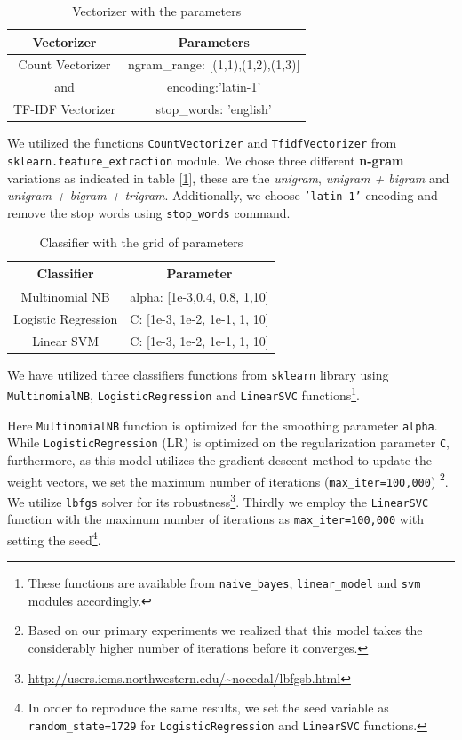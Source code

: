 \documentclass[11pt]{article}
\begin{document}
 \begin{table}[h!]
\scriptsize
     \centering
     \begin{tabular}{c|c}
     \hline 
         \textbf{Vectorizer} & \textbf{Parameters}  \\ \hline 
          Count Vectorizer & ngram\_range: [(1,1),(1,2),(1,3)]\\
          and & encoding:'latin-1'\\
          TF-IDF Vectorizer & stop\_words: 'english' \\
          \hline 
     \end{tabular}
     \caption{Vectorizer with the parameters}
     \label{tab:vectorizer_paras}
 \end{table}
We utilized the functions \texttt{CountVectorizer} and \texttt{TfidfVectorizer} from \texttt{sklearn.feature\_extraction} module. We chose three different \textbf{n-gram} variations as indicated in table [\ref{tab:vectorizer_paras}], these are the \textit{unigram}, \textit{unigram + bigram} and \textit{unigram + bigram + trigram}.
Additionally, we choose \texttt{'latin-1'} encoding and remove the stop words using \texttt{stop\_words} command.
\begin{table}[h!]
\scriptsize
    \centering
    \begin{tabular}{c|c}
    \hline
   \textbf{Classifier} & \textbf{Parameter} \\ \hline 
     Multinomial NB & alpha: [1e-3,0.4, 0.8, 1,10] \\ 
      Logistic Regression &  C: [1e-3, 1e-2, 1e-1, 1, 10] \\
      Linear SVM & C: [1e-3, 1e-2, 1e-1, 1, 10] \\\hline 
    \end{tabular}
    \caption{Classifier with the grid of parameters}
    \label{tab:classfiers_para}
\end{table}
We have utilized three classifiers functions from \texttt{sklearn} library using \texttt{MultinomialNB}, \texttt{LogisticRegression} and \texttt{LinearSVC} functions\footnote{These functions are available from \texttt{naive\_bayes}, \texttt{linear\_model} and \texttt{svm} modules accordingly.}.

Here \texttt{MultinomialNB} function is optimized for the smoothing parameter \texttt{alpha}. While \texttt{LogisticRegression} (LR) is optimized on the regularization parameter \texttt{C}, furthermore, as this model utilizes the gradient descent method to update the weight vectors, we set the maximum number of iterations (\texttt{max\_iter=100,000}) \footnote{Based on our primary experiments we realized that this model takes the considerably higher number of iterations before it converges.}. We utilize \texttt{lbfgs} solver \cite{lbfgs} for its robustness\footnote{\url{http://users.iems.northwestern.edu/~nocedal/lbfgsb.html}}. Thirdly we employ the \texttt{LinearSVC} function with the maximum number of iterations as \texttt{max\_iter=100,000} with setting the seed\footnote{In order to reproduce the same results, we set the seed variable as \texttt{random\_state=1729} for \texttt{LogisticRegression} and \texttt{LinearSVC} functions.}.
\end{document}
